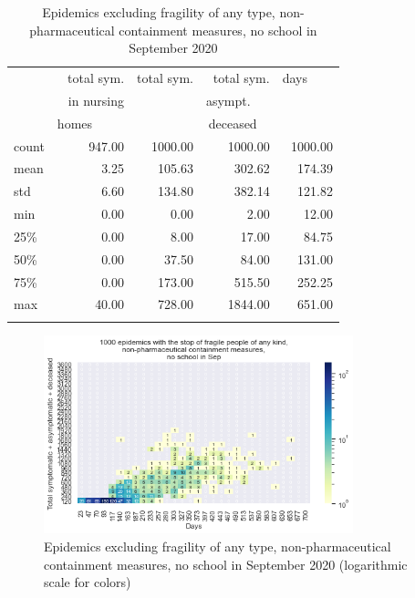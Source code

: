 \documentclass[graybox]{svmult}
\begin{document}
\begin{table}[t]
\center
\small
\begin{tabular}{lrrrr}
\hline\noalign{\smallskip}
{} & total sym.        &  total sym. & total sym.     & days~~~~ \\
{} & in nursing        &                  & asympt.~~~  & \\
{} & homes~~~~~  &                  & deceased~~ & \\
\noalign{\smallskip}\svhline\noalign{\smallskip}
count &     947.00 &             1000.00 &                 1000.00 & 1000.00 \\
mean  &       3.25 &              105.63 &                  302.62 &  174.39 \\
std   &       6.60 &              134.80 &                  382.14 &  121.82 \\
min   &       0.00 &                0.00 &                    2.00 &   12.00 \\
25\%   &       0.00 &                8.00 &                   17.00 &   84.75 \\
50\%   &       0.00 &               37.50 &                   84.00 &  131.00 \\
75\%   &       0.00 &              173.00 &                  515.50 &  252.25 \\
max   &      40.00 &              728.00 &                 1844.00 &  651.00 \\
\hline\noalign{\smallskip}
\end{tabular}

\label{EpidemicsNoAllFragileT}
\caption{Epidemics excluding fragility of any type, non-pharmaceutical containment measures, no school in September 2020}
\end{table}


\begin{figure}[t]
\begin{center}
\includegraphics[width=0.8\textwidth]{HM30_readRunResults1k_with_NoAllFrag_at20_plusHMlog.png}
\caption{Epidemics excluding fragility of any type, non-pharmaceutical containment measures, no school in September 2020 (logarithmic scale for colors)}
\label{EpidemicsNoAllFragileHM}
\end{center}
\end{figure}
\end{document}
